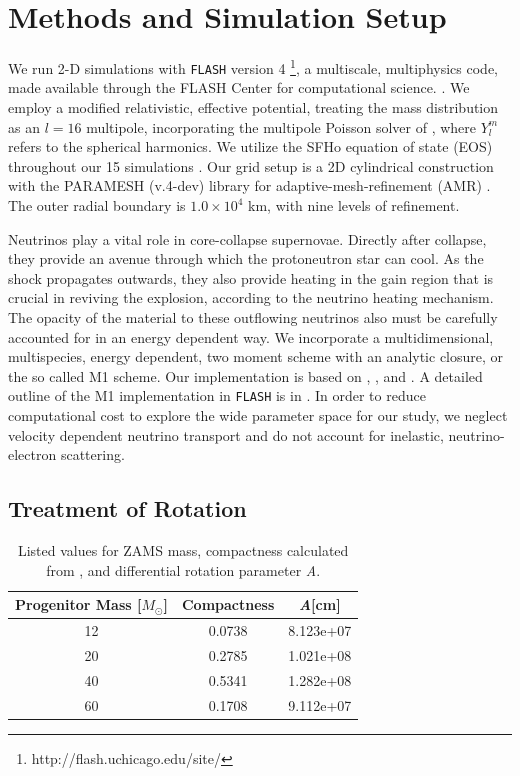 \documentclass[twocolumn,times]{aastex62}  %
\begin{document}
\section{Methods and Simulation Setup}
\label{sec:method}
We run 2-D simulations with \texttt{FLASH} version 4 \footnote{http://flash.uchicago.edu/site/}, a multiscale, multiphysics code, made available through the FLASH Center for computational science. \citep{fryxell:2000,dubey:2009}.  We employ a modified relativistic, effective potential, treating the mass distribution as an $l=16$ multipole, incorporating the multipole Poisson solver of \citet{couch:2013a}, where $Y_l^m$ refers to the spherical harmonics.  We utilize the SFHo equation of state (EOS) throughout our 15 simulations \citep{steiner:2013}.  Our grid setup is a 2D cylindrical construction with the PARAMESH (v.4-dev) library for adaptive-mesh-refinement (AMR) \citep{macneice:2000}.  The outer radial boundary is $1.0 \times 10^4$ km, with nine levels of refinement.  \par
Neutrinos play a vital role in core-collapse supernovae.  Directly after collapse, they provide an avenue through which the protoneutron star can cool.  As the shock propagates outwards, they also provide heating in the gain region that is crucial in reviving the explosion, according to the neutrino heating mechanism.  The opacity of the material to these outflowing neutrinos also must be carefully accounted for in an energy dependent way.  We incorporate a multidimensional, multispecies, energy dependent, two moment scheme with an analytic closure, or the so called M1 scheme.  Our implementation is based on \citet{oconnor:2015}, \citet{shibata:2011}, and \citet{cardall:2013}.  A detailed outline of the M1 implementation in \texttt{FLASH} is in \citet{oconnor:2018}.  In order to reduce computational cost to explore the wide parameter space for our study, we neglect velocity dependent neutrino transport and do not account for inelastic, neutrino-electron scattering.

\subsection{Treatment of Rotation}

\begin{table}[t]
\begin{tabular}{c|c|c}
Progenitor Mass [$M_\odot$] & Compactness & \textit{A}[cm] \\
\hline

12  & 0.0738 &         8.123e+07             \\
20  & 0.2785 &         1.021e+08            \\
40  & 0.5341 &         1.282e+08           \\
60  & 0.1708 &         9.112e+07          
\end{tabular}
\caption{Listed values for ZAMS mass, compactness calculated from \citet{Suk:2016}, and differential rotation parameter \textit{A}.}
\label{table:compact}
\end{table}
\end{document}
